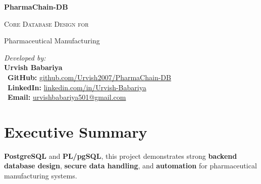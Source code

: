 \documentclass[12pt, a4paper]{article}
\begin{document}
\begin{titlepage}
    \centering
    \vspace*{2cm}
    
    
    {\Huge\bfseries PharmaChain-DB\par}
    \vspace{0.5cm}
   {\LARGE\scshape Core Database Design for\par Pharmaceutical Manufacturing\par}
    
    \vspace{2.5cm}
    
    {\Large\itshape Developed by:}\\[0.5cm]
    {\LARGE \textbf{Urvish Babariya}}\\[0.8cm]
    

{\large \faGithub\ \textbf{GitHub:} 
\href{https://github.com/Urvish2007/PharmaChain-DB}{github.com/Urvish2007/PharmaChain-DB}}\\[0.2cm]

{\large \faLinkedin\ \textbf{LinkedIn:} 
\href{https://www.linkedin.com/in/urvish-babariya-b38180305/}{linkedin.com/in/Urvish-Babariya}}\\[0.2cm]

{\large \faEnvelope\ \textbf{Email:} 
\href{mailto:urvishbabariya501@gmail.com}{urvishbabariya501@gmail.com}}\\[2cm]

    \vfill
    {\large \textbf{}}
\end{titlepage}

\newpage
\tableofcontents
\newpage

\section{Executive Summary}
\textbf{PostgreSQL} and \textbf{PL/pgSQL}, this project demonstrates strong \textbf{backend database design}, \textbf{secure data handling}, and \textbf{automation} for pharmaceutical manufacturing systems.
\end{document}
